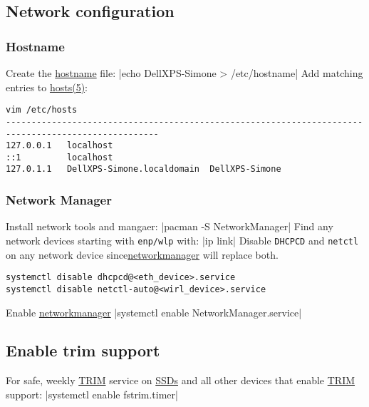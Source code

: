 \documentclass[11pt,A4]{article}
\newcommand{\linecode}[1]{ \mint[fontsize=\small,bgcolor=ArchCode,frame=single]{bash}|#1|}
\begin{document}
\subsection{Network configuration}
\subsubsection{Hostname}
Create the \href{https://wiki.archlinux.org/index.php/Hostname}{hostname} file:
\linecode{echo DellXPS-Simone > /etc/hostname}
Add matching entries to \href{https://jlk.fjfi.cvut.cz/arch/manpages/man/hosts.5}{hosts(5)}:
\begin{verbatim}
vim /etc/hosts
----------------------------------------------------------------------------------------------------
127.0.0.1	localhost
::1		    localhost
127.0.1.1	DellXPS-Simone.localdomain	DellXPS-Simone
\end{verbatim}
\subsubsection{Network Manager}
Install network tools and mangaer:
\linecode{pacman -S NetworkManager}
Find any network devices starting with \texttt{enp/wlp} with:
\linecode{ip link}
Disable \texttt{DHCPCD} and \texttt{netctl} on any network device since\href{https://wiki.archlinux.org/index.php/NetworkManager}{networkmanager} will replace both.\\
\vspace{-3mm}
\begin{verbatim}
systemctl disable dhcpcd@<eth_device>.service
systemctl disable netctl-auto@<wirl_device>.service
\end{verbatim}
Enable \href{https://wiki.archlinux.org/index.php/NetworkManager}{networkmanager}
\linecode{systemctl enable NetworkManager.service}

\vspace{-7mm}
\subsection{Enable trim support}
For safe, weekly \href{https://wiki.archlinux.org/index.php/Solid_state_drive#TRIM}{TRIM} service on \href{https://wiki.archlinux.org/index.php/Solid_state_drive}{SSDs} and all other devices that enable \href{https://wiki.archlinux.org/index.php/Solid_state_drive#TRIM}{TRIM} support:
\linecode{systemctl enable fstrim.timer}
\end{document}
